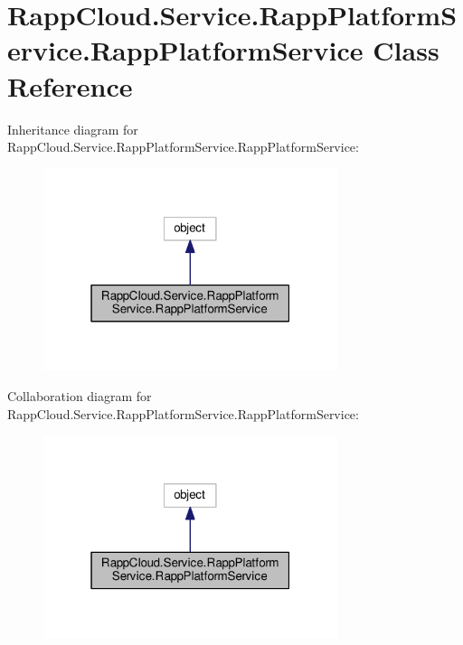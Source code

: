 \hypertarget{classRappCloud_1_1Service_1_1RappPlatformService_1_1RappPlatformService}{\section{Rapp\-Cloud.\-Service.\-Rapp\-Platform\-Service.\-Rapp\-Platform\-Service Class Reference}
\label{classRappCloud_1_1Service_1_1RappPlatformService_1_1RappPlatformService}
}


Inheritance diagram for Rapp\-Cloud.\-Service.\-Rapp\-Platform\-Service.\-Rapp\-Platform\-Service\-:
\nopagebreak
\begin{figure}[H]
\begin{center}
\leavevmode
\includegraphics[width=244pt]{classRappCloud_1_1Service_1_1RappPlatformService_1_1RappPlatformService__inherit__graph}
\end{center}
\end{figure}


Collaboration diagram for Rapp\-Cloud.\-Service.\-Rapp\-Platform\-Service.\-Rapp\-Platform\-Service\-:
\nopagebreak
\begin{figure}[H]
\begin{center}
\leavevmode
\includegraphics[width=244pt]{classRappCloud_1_1Service_1_1RappPlatformService_1_1RappPlatformService__coll__graph}
\end{center}
\end{figure}
